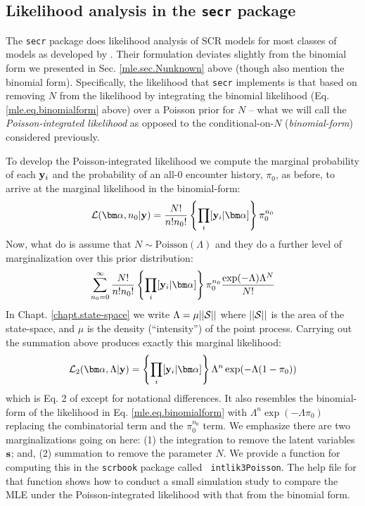 \subsection{Likelihood analysis in the \mbox{\tt secr} package}
\label{mle.sec.secrguts}

The \mbox{\tt secr} package does likelihood analysis of SCR models for
most classes of models as developed by
\citet{borchers_efford:2008}. Their formulation deviates slightly from
the binomial form we presented in Sec.  \ref{mle.sec.Nunknown} above
(though \citet{borchers_efford:2008} also mention the binomial form).
Specifically, the likelihood that \mbox{\tt secr} implements is that
based on removing $N$ from the likelihood by integrating the binomial
likelihood (Eq.  \ref{mle.eq.binomialform} above) over a Poisson prior
for $N$ -- what we will call the {\it Poisson-integrated likelihood} as
opposed to the conditional-on-$N$ ({\it binomial-form}) considered
previously.

To develop the Poisson-integrated likelihood 
we compute the marginal
probability of each ${\bf y}_{i}$ and the probability of an all-0
encounter history, $\pi_{0}$, as before, 
to arrive at the  marginal likelihood in the binomial-form:
\[
 {\cal L}({\bm \alpha},n_{0} | {\bf y})  = \frac{N!}{n! n_{0}!} 
 \left\{ \prod_{i}  [{\bf y}_{i}|{\bm \alpha}] 
\right\}
 \pi_{0}^{n_{0}}
\]
Now, what \citet{borchers_efford:2008} do is
assume that $N \sim \mbox{Poisson}(\Lambda)$ and they do a further level
of marginalization over this prior distribution:
\[
\sum_{n_{0}=0}^{\infty}  
\frac{N!}{n! n_{0}!} 
 \left\{ \prod_{i}  [{\bf y}_{i}|{\bm \alpha}] \right\}
 \pi_{0}^{n_{0}}
\frac{\exp(-\Lambda) \Lambda^{N}}{N!}
\]
In Chapt. \ref{chapt.state-space} we write $\Lambda = \mu ||{\cal
  S}||$ where $||{\cal S}||$ is the area of the state-space, and $\mu$
is the density (``intensity'') of the point process. 
Carrying out the summation above produces exactly this marginal likelihood:
\[
{\cal L}_{2}({\bm \alpha}, \Lambda | {\bf y}) = 
 \left\{ \prod_{i}  [{\bf y}_{i}|{\bm \alpha}] \right\}  \Lambda^{n}   \exp( - \Lambda (1-\pi_{0}) )
\]
which is Eq. 2 of \citet{borchers_efford:2008} except for notational
differences. It also resembles the binomial-form of the likelihood in
Eq. \ref{mle.eq.binomialform} with $\Lambda^{n} \exp( - \Lambda
\pi_{0} )$ replacing the combinatorial term and the $\pi_{0}^{n_{0}}$
term.  We emphasize there are two marginalizations going on here: (1)
the integration to remove the latent variables ${\bf s}$; and, (2)
summation to remove the parameter $N$.  We provide a function for
computing this in the \mbox{\tt scrbook} package called \mbox{\tt
  intlik3Poisson}. The help file for that function shows how to
conduct a small simulation study to compare the MLE under the
Poisson-integrated likelihood with that from the binomial form.

